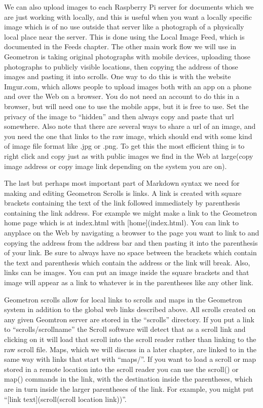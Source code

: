 We can also upload images to each Raspberry Pi server for documents which we are just working with locally, and this is useful when you want a locally specific image which is of no use outside that server like a photograph of a physically local place near the server.  This is done using the Local Image Feed, which is documented in the Feeds chapter.  The other main work flow we will use in Geometron is taking original photographs with mobile devices, uploading those photographs to publicly visible locations, then copying the address of those images and pasting it into scrolls.  One way to do this is with the website Imgur.com, which allows people to upload images both with an app on a phone and over the Web on a browser.  You do not need an account to do this in a browser, but will need one to use the mobile apps, but it is free to use. Set the privacy of the image to ``hidden'' and then always copy and paste that url somewhere.  Also note that there are several ways to share a url of an image, and you need the one that links to the raw image, which should end with some kind of image file format like .jpg or .png. To get this the most efficient thing is to right click and copy just as with public images we find in the Web at large(copy image address or copy image link depending on the system you are on).  

The last but perhaps most important part of Markdown syntax we need for making and editing Geometron Scrolls is links.  A link is created with square brackets containing the text of the link followed immediately by parenthesis containing the link address.  For example we might make a link to the Geometron home page which is at index.html with [home](index.html).  You can link to anyplace on the Web by navigating a browser to the page you want to link to and copying the address from the address bar and then pasting it into the parenthesis of your link.  Be sure to always have no space between the brackets which contain the text and parenthesis which contain the address or the link will break.  Also, links can be images.  You can put an image inside the square brackets and that image will appear as a link to whatever is in the parentheses like any other link.  


Geometron scrolls allow for local links to scrolls and maps in the Geometron system in addition to the global web links described above.  All scrolls created on any given Geomtron server are stored in the ``scrolls'' directory.  If you put a link to ``scrolls/scrollname'' the Scroll software will detect that as a scroll link and clicking on it will load that scroll into the scroll reader rather than linking to the raw scroll file.  Maps, which we will discuss in a later chapter, are linked to in the same way with links that start with ``maps/''.  If you want to load a scroll or map stored in a remote location into the scroll reader you can use the scroll() or map() commands in the link, with the destination inside the parentheses, which are in turn inside the larger parentheses of the link.  For example, you might put ``[link text](scroll(scroll location link))''.

